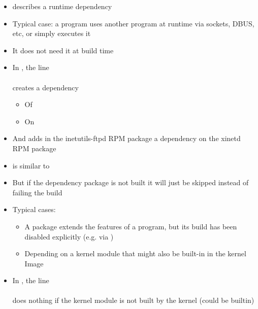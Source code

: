 \begin{frame}{}
  \begin{itemize}
    \item {} describes a runtime dependency
    \item Typical case: a program uses another program at runtime via
      sockets, DBUS, etc, or simply executes it
    \item It does not need it at build time
    \item In , the line\\
      \\
      creates a dependency
      \begin{itemize}
      \item Of 
      \item On 
      \end{itemize}
    \item And adds in the inetutils-ftpd RPM package a dependency on
      the xinetd RPM package
  \end{itemize}
\end{frame}

\begin{frame}{}
  \begin{itemize}
    \item {} is similar to 
    \item But if the dependency package is not built it will just be
      skipped instead of failing the build
    \item Typical cases:
      \begin{itemize}
        \item A package extends the features of a program, but its build
          has been disabled explicitly (e.g. via )
        \item Depending on a kernel module that might also be built-in in
          the kernel Image
      \end{itemize}
    \item In , the line\\
      \\
      does nothing if the  kernel module is not built by
      the kernel (could be builtin)
  \end{itemize}
\end{frame}

